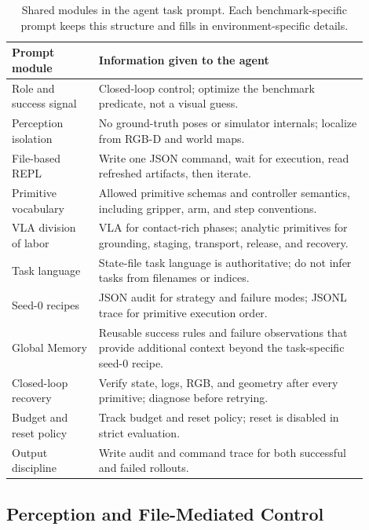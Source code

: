 \documentclass{article}
\begin{document}
\begin{table}[h]
\centering
\caption{Shared modules in the agent task prompt. Each benchmark-specific prompt
keeps this structure and fills in environment-specific details.}
\label{tab:app_prompt_shared_modules}
\small
\setlength{\tabcolsep}{4pt}
\begin{tabular}{p{0.22\linewidth}p{0.68\linewidth}}
\toprule
Prompt module & Information given to the agent \\
\midrule
Role and success signal &
Closed-loop control; optimize the benchmark predicate, not a visual guess. \\
Perception isolation &
No ground-truth poses or simulator internals; localize from RGB-D and world maps. \\
File-based REPL &
Write one JSON command, wait for execution, read refreshed artifacts, then iterate. \\
Primitive vocabulary &
Allowed primitive schemas and controller semantics, including gripper, arm, and step
conventions. \\
VLA division of labor &
VLA for contact-rich phases; analytic primitives for grounding, staging, transport,
release, and recovery. \\
Task language &
State-file task language is authoritative; do not infer tasks from filenames or
indices. \\
Seed-0 recipes &
JSON audit for strategy and failure modes; JSONL trace for primitive execution order. \\
Global Memory &
Reusable success rules and failure observations that provide additional context beyond
the task-specific seed-0 recipe. \\
Closed-loop recovery &
Verify state, logs, RGB, and geometry after every primitive; diagnose before retrying. \\
Budget and reset policy &
Track budget and reset policy; reset is disabled in strict evaluation. \\
Output discipline &
Write audit and command trace for both successful and failed rollouts. \\
\bottomrule
\end{tabular}
\end{table}

\subsection{Perception and File-Mediated Control}
\label{app:agent_prompt:perception}
\end{document}
